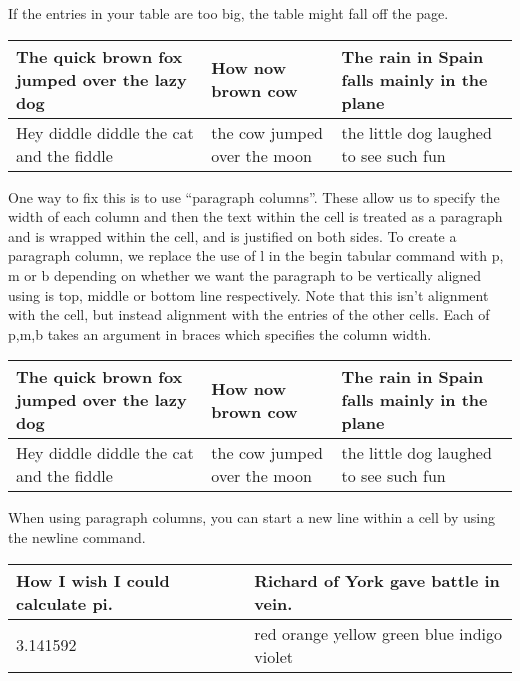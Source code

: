 \documentclass[a4paper,11pt]{article}
\begin{document}
If the entries in your table are too big, the table might fall off the page.
%
\begin{table}[hbtp]
	\centering
	\begin{tabular}{l|l|l}
		\hline
		The quick brown fox jumped over the lazy dog & How now brown cow & The rain in Spain falls mainly in the plane \\
		\hline
		Hey diddle diddle the cat and the fiddle & the cow jumped over the moon & the little dog laughed to see such fun \\
		\hline
	\end{tabular}
\end{table}

One way to fix this is to use ``paragraph columns''. These allow us to specify the width of each column and then the text within the cell is treated as a paragraph and is wrapped within the cell, and is justified on both sides. To create a paragraph column, we replace the use of l in the begin tabular command with p, m or b depending on whether we want the paragraph to be vertically aligned using is top, middle or bottom line respectively. Note that this isn't alignment with the cell, but instead alignment with the entries of the other cells. Each of p,m,b takes an argument in braces which specifies the column width.
%
\begin{table}[!hbtp]
	\centering
	\begin{tabular}{p{1.5in} | m{1in} | b{2.5cm}}
		\hline
		The quick brown fox jumped over the lazy dog & How now brown cow & The rain in Spain falls mainly in the plane \\
		\hline
		Hey diddle diddle the cat and the fiddle & the cow jumped over the moon & the little dog laughed to see such fun \\
		\hline
	\end{tabular}
\end{table}

When using paragraph columns, you can start a new line within a cell by using the newline command.
%
\begin{table}[hbtp]
	\centering
	\begin{tabular}{| p{5cm} | p{5cm} | }
		\hline
		How I wish \newline I could calculate \newline pi. 	& Richard of \newline York gave \newline battle in \newline vein.\\
		\hline
		3.141592 											& red orange yellow green blue indigo violet\\
		\hline
	\end{tabular}
\end{table}
\end{document}
